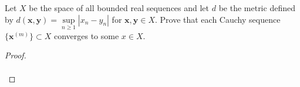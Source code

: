 Let $X$ be the space of all bounded real sequences and let $d$ be the metric
defined by $d(\textbf{x}, \textbf{y}) = \sup\limits_{n \ge 1}{|x_n - y_n|}$
for $\textbf{x}, \textbf{y} \in X$. Prove that each Cauchy sequence
$\{\textbf{x}^{(m)}\} \subset X$ converges to some $x \in X$.


\begin{proof}\renewcommand{\qedsymbol}{}\ \\\\
\end{proof}

\pagebreak